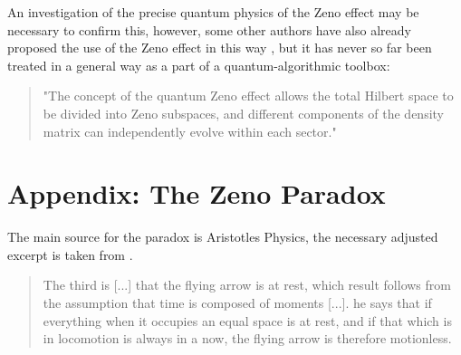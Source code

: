 \documentclass[10pt]{amsart}
\theoremstyle{definition}
\theoremstyle{remark}
\begin{document}
    An investigation of the precise quantum physics of the Zeno effect may be necessary to confirm this, however, some other authors have also already proposed the use of the Zeno effect in this way \cite[p. 4]{Wan}, but it has never so far been treated in a general way as a part of a quantum-algorithmic toolbox:
    \begin{quote}
        "The concept of the quantum Zeno effect allows the total Hilbert space to be divided into Zeno subspaces, and different components of the density matrix can independently evolve within each sector."
    \end{quote}

    \section*{Appendix: The Zeno Paradox} \label{appendix} The main source for the paradox is Aristotles Physics, the necessary adjusted excerpt is taken from \cite[p. 110]{Aristotle}.

    \begin{quote}
        The third is [...] that the flying arrow is at rest, which result follows from the assumption that time is composed of moments [...]. he says that if everything when it occupies an equal space is at rest, and if that which is in locomotion is always in a now, the flying arrow is therefore motionless.
    \end{quote}


    \printbibliography{}
\end{document}
